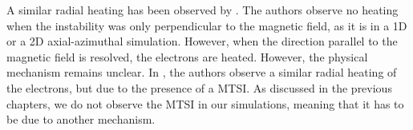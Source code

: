   A similar radial heating has been observed by \citet{heron2013}.
  The authors observe no heating when the instability was only perpendicular to the magnetic field, as it is in a \ac{1D} or a \ac{2D} axial-azimuthal simulation.
  However, when the direction parallel to the magnetic field is resolved, the electrons are heated.
  However, the physical mechanism remains unclear.
  In \citet{janhunen}, the authors observe a similar radial heating of the electrons, but due to the presence of a \ac{MTSI}.
  As discussed in the previous chapters, we do not observe the \ac{MTSI} in our simulations, meaning that it has to be due to another mechanism.


